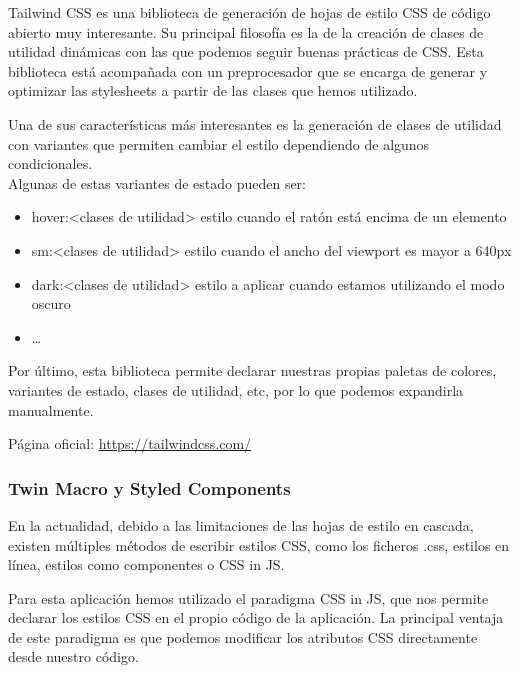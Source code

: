 Tailwind CSS es una biblioteca de generación de hojas de estilo CSS de
código abierto muy interesante. Su principal filosofía es la de la
creación de clases de utilidad dinámicas con las que podemos seguir
buenas prácticas de CSS. Esta biblioteca está acompañada con un
preprocesador que se encarga de generar y optimizar las stylesheets a
partir de las clases que hemos utilizado.

Una de sus características más interesantes es la generación de clases
de utilidad con variantes que permiten cambiar el estilo dependiendo de
algunos condicionales.\\
Algunas de estas variantes de estado pueden ser:

\begin{itemize}
\itemsep0em 
\item
  hover:\textless clases de utilidad\textgreater{} estilo cuando el
  ratón está encima de un elemento
\item
  sm:\textless clases de utilidad\textgreater{} estilo cuando el ancho
  del viewport es mayor a 640px
\item
  dark:\textless clases de utilidad\textgreater{} estilo a aplicar
  cuando estamos utilizando el modo oscuro
\item
  \ldots{}
\end{itemize}

Por último, esta biblioteca permite declarar nuestras propias paletas de
colores, variantes de estado, clases de utilidad, etc, por lo que
podemos expandirla manualmente.

Página oficial: \href{https://tailwindcss.com/}{https://tailwindcss.com/}


\hypertarget{twin-macro-y-styled-components}{%
\subsubsection{Twin Macro y Styled
Components}\label{twin-macro-y-styled-components}}

En la actualidad, debido a las limitaciones de las hojas de estilo en
cascada, existen múltiples métodos de escribir estilos CSS, como los ficheros .css, estilos en línea, estilos como componentes o CSS in JS.


Para esta aplicación hemos utilizado el paradigma CSS in JS, que nos
permite declarar los estilos CSS en el propio código de la aplicación.
La principal ventaja de este paradigma es que podemos modificar los
atributos CSS directamente desde nuestro código.

